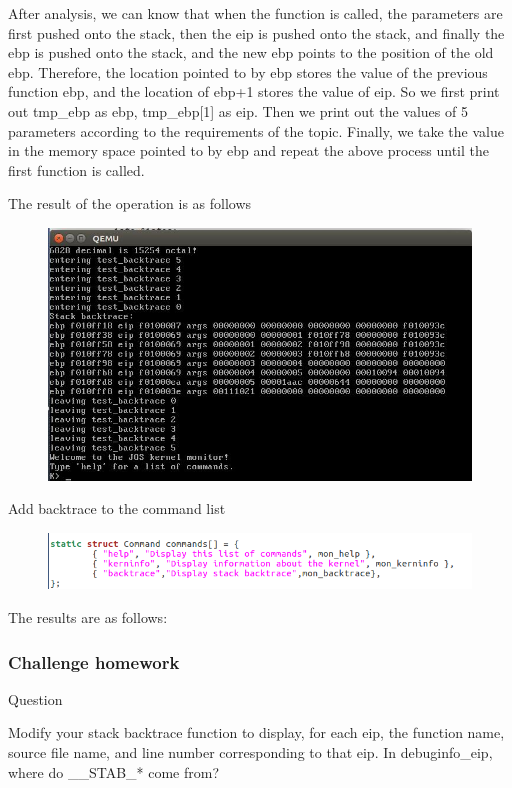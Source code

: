 After analysis, we can know that when the function is called, the parameters are first pushed onto the stack, then the eip is pushed onto the stack, and finally the ebp is pushed onto the stack, and the new ebp points to the position of the old ebp. Therefore, the location pointed to by ebp stores the value of the previous function ebp, and the location of ebp+1 stores the value of eip. So we first print out tmp\_ebp as ebp, tmp\_ebp[1] as eip. Then we print out the values ​​of 5 parameters according to the requirements of the topic. Finally, we take the value in the memory space pointed to by ebp and repeat the above process until the first function is called.

The result of the operation is as follows
\begin{figure}[H]
  \centering
  \includegraphics[width=0.8\linewidth]{figure/mon_backtrace_qemu}
\end{figure}


Add backtrace to the command list
\begin{figure}[H]
  \centering
  \includegraphics[width=0.8\linewidth]{figure/add_backtrace}
\end{figure}

The results are as follows:
\subsubsection{Challenge homework}
\begin{flushleft}
{\Large Question}
\end{flushleft}

Modify your stack backtrace function to display, for each eip, the function name, source file name, and line number corresponding to that eip.
In debuginfo\_eip, where do \_\_STAB\_* come from?

